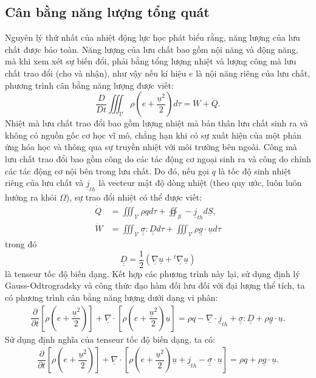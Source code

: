 \documentclass[../../../main.tex]{subfiles}
\begin{document}
\subsection{Cân bằng năng lượng tổng quát}
    Nguyên lý thứ nhất của nhiệt động lực học phát biểu rằng, năng lượng của lưu chất được bảo toàn. Năng lượng của lưu chất bao gồm nội năng và động năng, mà khi xem xét sự biến đổi, phải bằng tổng lượng nhiệt và lượng công mà lưu chất trao đổi (cho và nhận), như vậy nếu kí hiệu $e$ là nội năng riêng của lưu chất, phương trình cân bằng năng lượng được viết:
        \[
            \dfrac{D}{Dt}\iiint_\mathscr{V}\rho\left(e+\dfrac{\underline{u}^2}{2}\right)d\tau=\dot{W}+\dot{Q}.
            \]
    Nhiệt mà lưu chất trao đổi bao gồm lượng nhiệt mà bản thân lưu chất sinh ra và không có nguồn gốc cơ học vĩ mô, chẳng hạn khi có sự xuất hiện của một phản ứng hóa học và thông qua sự truyền nhiệt với môi trường bên ngoài. Công mà lưu chất trao đổi bao gồm công do các tác động cơ ngoại sinh ra và công do chính các tác động cơ nội bên trong lưu chất. Do đó, nếu gọi $q$ là tốc độ sinh nhiệt riêng của lưu chất và $\underline{j}_{th}$ là vecteur mật độ dòng nhiệt (theo quy ước, luôn luôn hướng ra khỏi $\Omega$), sự trao đổi nhiệt có thể được viết:
    \[
            \begin{aligned}
                \dot{Q}&=\iiint_\mathscr{V}\rho qd\tau+\oiint_\mathscr{S} -\underline{j}_{th}d\underline{S},\\
                \dot{W}&=\iiint_\mathscr{V}\underline{\underline{\sigma}}:\underline{\underline{D}}d\tau+\iiint_\mathscr{V}\rho \underline{g}\cdot\underline{u}d\tau
            \end{aligned}
        \]
    trong đó
        \[
            \underline{\underline{D}}=\dfrac{1}{2}\left(\underline{\nabla}\underline{u} +{}^t\underline{\nabla}\underline{u}\right)
        \]
    là tenseur tốc độ biến dạng. Kết hợp các phương trình này lại, sử dụng định lý Gauss-Odtrogradsky và công thức đạo hàm đối lưu đối với đại lượng thể tích, ta có phương trình cân bằng năng lượng dưới dạng vi phân:
    \begin{align}
        \dfrac{\partial}{\partial t}\left[\rho\left(e+\dfrac{\underline{u}^2}{2}\right)\right]+\underline{\nabla}\cdot\left[\rho\left(e+\dfrac{\underline{u}^2}{2}\right)\underline{u}\right]=\rho q-\underline{\nabla}\cdot\underline{j}_{th}+\underline{\underline{\sigma}}:\underline{\underline{D}}+\rho\underline{g}\cdot\underline{u}.
    \end{align}
    Sử dụng định nghĩa của tenseur tốc độ biến dạng, ta có:
        \begin{align}\label{eq:conserver_energie}
            \dfrac{\partial}{\partial t}\left[\rho\left(e+\dfrac{\underline{u}^2}{2}\right)\right]+\underline{\nabla}\cdot\left[\rho\left(e+\dfrac{\underline{u}^2}{2}\right)\underline{u}+\underline{j}_{th}-\underline{\underline{\sigma}}\cdot\underline{u}\right]=\rho q+\rho\underline{g}\cdot\underline{u}.
        \end{align}
\end{document}
